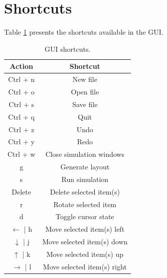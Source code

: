 \section{Shortcuts}
Table \ref{tb:shortcuts} presents the shortcuts available in the GUI.

\begin{table}
\begin{center}
\begin{singlespace}
\begin{tabular}{| c | c |}
\hline
Action & Shortcut \\
\hline
\hline
Ctrl + n & New file \\
Ctrl + o & Open file \\
Ctrl + s & Save file \\
Ctrl + q & Quit \\
Ctrl + z & Undo \\
Ctrl + y & Redo \\
Ctrl + w & Close simulation windows \\
g & Generate layout \\
s & Run simulation \\
Delete & Delete selected item(s) \\
r & Rotate selected item \\
d & Toggle cursor state \\
$\leftarrow$ | h & Move selected item(s) left \\
$\downarrow$ | j & Move selected item(s) down \\
$\uparrow$ | k & Move selected item(s) up \\
$\rightarrow$ | l & Move selected item(s) right \\
\hline
\end{tabular}
\end{singlespace}
\end{center}
\caption[GUI shortcuts]{GUI shortcuts.}
\label{tb:shortcuts}
\end{table}

